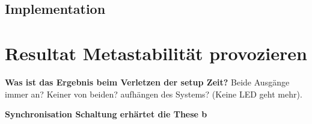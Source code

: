 \subsection{Implementation}\label{sect.metastabil_implementation}


\section{Resultat Metastabilität provozieren}\label{sect.meatastabil_proozieren}
\textbf{Was ist das Ergebnis beim Verletzen der setup Zeit?}
Beide Ausgänge immer an?
Keiner von beiden?
aufhängen des Systems? (Keine LED geht mehr).

\textbf{Synchronisation Schaltung erhärtet die These b\\}
